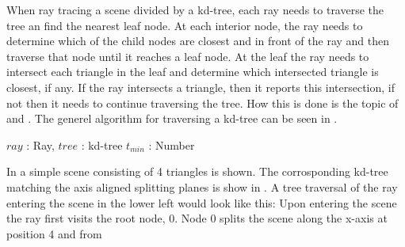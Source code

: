 
When ray tracing a scene divided by a kd-tree, each ray needs to
traverse the tree an find the nearest leaf node. At each interior
node, the ray needs to determine which of the child nodes are closest
and in front of the ray and then traverse that node until it reaches a
leaf node. At the leaf the ray needs to intersect each triangle in the
leaf and determine which intersected triangle is closest, if any. If
the ray intersects a triangle, then it reports this intersection, if
not then it needs to continue traversing the tree. How this is done is
the topic of  and
. The generel algorithm for traversing a
kd-tree can be seen in .

\begin{algorithm}
  \caption{A general kd-tree traversal algorithm}
  \label{alg:generelTraversal}
  \begin{algorithmic}
              {$ray$ : Ray, $tree$ : kd-tree}
              {$t_{min}$ : Number}{
                  \ELSE
                  \ENDIF
                \ENDWHILE
              }
  \end{algorithmic}
\end{algorithm}



In  a simple scene consisting of 4 triangles
is shown. The corrosponding kd-tree matching the axis aligned
splitting planes is show in . A tree traversal
of the ray entering the scene in the lower left would look like this:
Upon entering the scene the ray first visits the root node, $0$. Node
$0$ splits the scene along the x-axis at position 4 and from 

